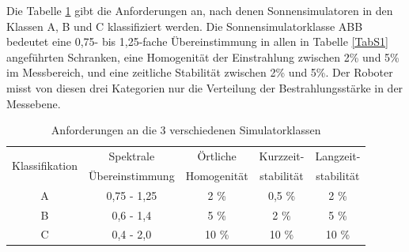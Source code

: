 \documentclass[a4paper,bibtotoc,oneside]{scrbook}
\begin{document}
Die Tabelle \ref{TabS2} gibt die Anforderungen an, nach denen Sonnensimulatoren in den Klassen A, B und C klassifiziert werden. Die Sonnensimulatorklasse ABB bedeutet eine 0,75- bis 1,25-fache Übereinstimmung in allen in Tabelle \ref{TabS1} angeführten Schranken, eine Homogenität der Einstrahlung zwischen 2\% und 5\% im Messbereich, und eine zeitliche Stabilität zwischen 2\% und 5\%. Der Roboter misst von diesen drei Kategorien nur die Verteilung der Bestrahlungsstärke in der Messebene.
\begin{table}[htbp]
\centering
\begin{tabular}{ | c | c | c | c | c |}\hline
\multirow{2}{*}{Klassifikation} &  Spektrale  &  Örtliche  & {Kurzzeit-}& {Langzeit-}\\
& Übereinstimmung & Homogenität & {stabilität} & {stabilität} \\ 
\hline
\hline
A  & 0,75 - 1,25 & 2 \% & 0,5 \% & 2 \%\\ \hline
B  & 0,6 - 1,4 & 5 \% & 2 \% & 5 \%\\ \hline
C  & 0,4 - 2,0 & 10 \% & 10 \% & 10 \%\\ \hline
\end{tabular}
\caption{Anforderungen an die 3 verschiedenen Simulatorklassen}\label{TabS2}
\end{table}
\end{document}
